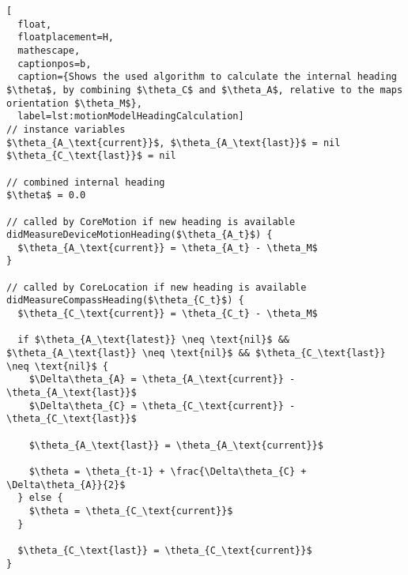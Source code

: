 \begin{lstlisting}[
  float,
  floatplacement=H,
  mathescape,
  captionpos=b,
  caption={Shows the used algorithm to calculate the internal heading $\theta$, by combining $\theta_C$ and $\theta_A$, relative to the maps orientation $\theta_M$},
  label=lst:motionModelHeadingCalculation]
// instance variables
$\theta_{A_\text{current}}$, $\theta_{A_\text{last}}$ = nil
$\theta_{C_\text{last}}$ = nil

// combined internal heading
$\theta$ = 0.0

// called by CoreMotion if new heading is available
didMeasureDeviceMotionHeading($\theta_{A_t}$) {
  $\theta_{A_\text{current}} = \theta_{A_t} - \theta_M$
}

// called by CoreLocation if new heading is available
didMeasureCompassHeading($\theta_{C_t}$) {
  $\theta_{C_\text{current}} = \theta_{C_t} - \theta_M$

  if $\theta_{A_\text{latest}} \neq \text{nil}$ && $\theta_{A_\text{last}} \neq \text{nil}$ && $\theta_{C_\text{last}} \neq \text{nil}$ {
    $\Delta\theta_{A} = \theta_{A_\text{current}} - \theta_{A_\text{last}}$
    $\Delta\theta_{C} = \theta_{C_\text{current}} - \theta_{C_\text{last}}$

    $\theta_{A_\text{last}} = \theta_{A_\text{current}}$

    $\theta = \theta_{t-1} + \frac{\Delta\theta_{C} + \Delta\theta_{A}}{2}$
  } else {
    $\theta = \theta_{C_\text{current}}$
  }

  $\theta_{C_\text{last}} = \theta_{C_\text{current}}$
}
\end{lstlisting}
